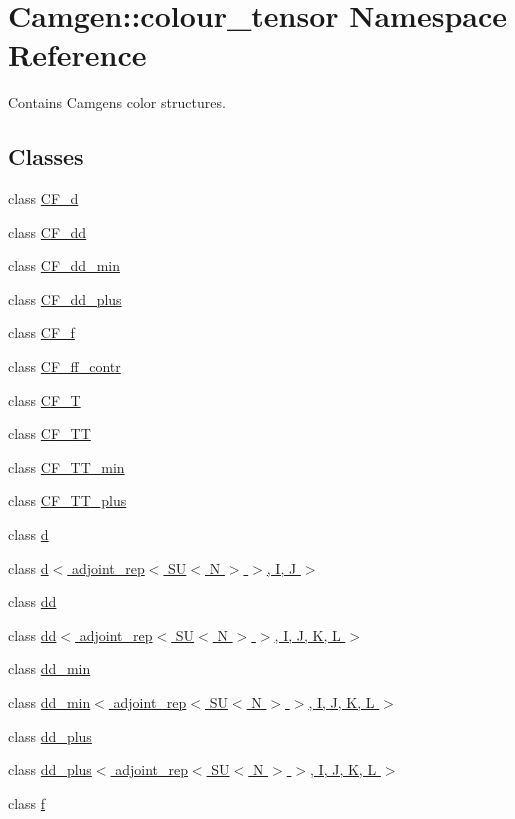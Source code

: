 \hypertarget{a00880}{}\section{Camgen\+:\+:colour\+\_\+tensor Namespace Reference}
\label{a00880}


Contains Camgen\textquotesingle{}s color structures.  


\subsection*{Classes}
\begin{DoxyCompactItemize}
\item 
class \hyperlink{a00028}{C\+F\+\_\+d}
\item 
class \hyperlink{a00029}{C\+F\+\_\+dd}
\item 
class \hyperlink{a00030}{C\+F\+\_\+dd\+\_\+min}
\item 
class \hyperlink{a00031}{C\+F\+\_\+dd\+\_\+plus}
\item 
class \hyperlink{a00032}{C\+F\+\_\+f}
\item 
class \hyperlink{a00033}{C\+F\+\_\+ff\+\_\+contr}
\item 
class \hyperlink{a00034}{C\+F\+\_\+\+T}
\item 
class \hyperlink{a00035}{C\+F\+\_\+\+T\+T}
\item 
class \hyperlink{a00036}{C\+F\+\_\+\+T\+T\+\_\+min}
\item 
class \hyperlink{a00037}{C\+F\+\_\+\+T\+T\+\_\+plus}
\item 
class \hyperlink{a00112}{d}
\item 
class \hyperlink{a00113}{d$<$ adjoint\+\_\+rep$<$ S\+U$<$ N $>$ $>$, I, J $>$}
\item 
class \hyperlink{a00117}{dd}
\item 
class \hyperlink{a00118}{dd$<$ adjoint\+\_\+rep$<$ S\+U$<$ N $>$ $>$, I, J, K, L $>$}
\item 
class \hyperlink{a00119}{dd\+\_\+min}
\item 
class \hyperlink{a00120}{dd\+\_\+min$<$ adjoint\+\_\+rep$<$ S\+U$<$ N $>$ $>$, I, J, K, L $>$}
\item 
class \hyperlink{a00121}{dd\+\_\+plus}
\item 
class \hyperlink{a00122}{dd\+\_\+plus$<$ adjoint\+\_\+rep$<$ S\+U$<$ N $>$ $>$, I, J, K, L $>$}
\item 
class \hyperlink{a00217}{f}
\item 

\end{DoxyCompactItemize}
